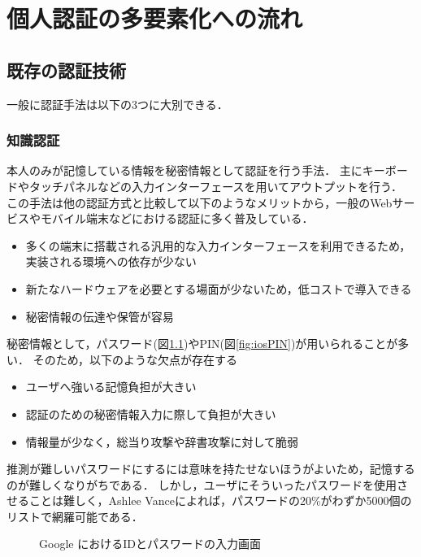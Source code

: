 \chapter{個人認証の多要素化への流れ}\label{chap:preparation}

\section{既存の認証技術}
一般に認証手法は以下の3つに大別できる．

\subsection{知識認証}\label{subsec:knowledge}
本人のみが記憶している情報を秘密情報として認証を行う手法．
主にキーボードやタッチパネルなどの入力インターフェースを用いてアウトプットを行う．
この手法は他の認証方式と比較して以下のようなメリットから，一般のWebサービスやモバイル端末などにおける認証に多く普及している．
\begin{itemize}
\item 多くの端末に搭載される汎用的な入力インターフェースを利用できるため，実装される環境への依存が少ない
\item 新たなハードウェアを必要とする場面が少ないため，低コストで導入できる
\item 秘密情報の伝達や保管が容易
\end{itemize}
秘密情報として，パスワード(図\ref{fig:loginGoogleWithIDAndPass})やPIN(図\ref{fig:iosPIN})が用いられることが多い．
そのため，以下のような欠点が存在する
\begin{itemize}
\item ユーザへ強いる記憶負担が大きい
\item 認証のための秘密情報入力に際して負担が大きい
\item 情報量が少なく，総当り攻撃や辞書攻撃に対して脆弱
\end{itemize}
推測が難しいパスワードにするには意味を持たせないほうがよいため，記憶するのが難しくなりがちである．
しかし，ユーザにそういったパスワードを使用させることは難しく，Ashlee Vance\cite{21password}によれば，パスワードの20\%がわずか5000個のリストで網羅可能である．

\begin{figure}[th]
\begin{center}
\end{center}
\caption{Google におけるIDとパスワードの入力画面}
\label{fig:loginGoogleWithIDAndPass}
\end{figure}

